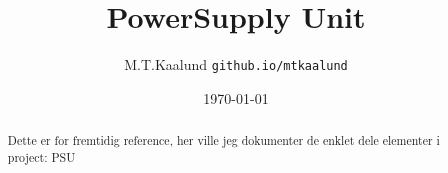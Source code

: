 \documentclass[11pt,a4paper,twoside]{article}
\begin{document}
\title{PowerSupply Unit}
\author{M.T.Kaalund \texttt{github.io/mtkaalund}}
\date{\today}

\maketitle

\begin{abstract}
Dette er for fremtidig reference, her ville jeg dokumenter de enklet dele elementer i project: PSU
\end{abstract}

\tableofcontents
\end{document}
